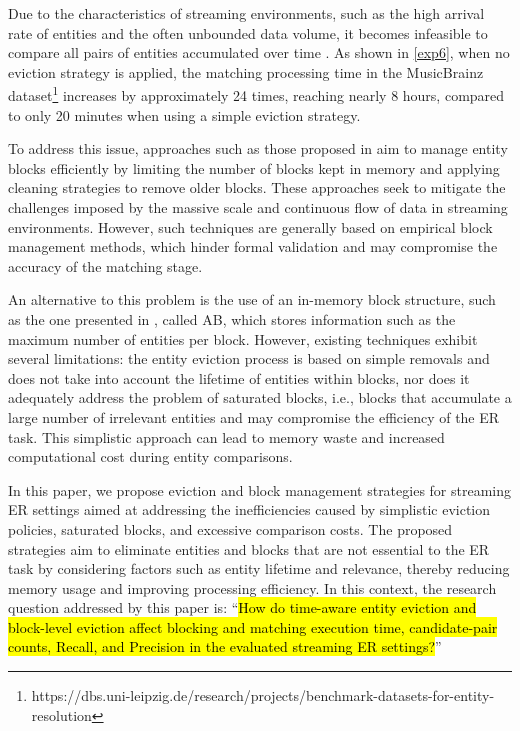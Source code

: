 \documentclass{ieeeaccess}
\begin{document}
Due to the characteristics of streaming environments,  such as the high arrival rate of entities and the often unbounded data volume, it becomes infeasible to compare all pairs of entities accumulated over time \cite{10.1145/3448016.3457238}. As shown in \ref{exp6}, when no eviction strategy is applied, the matching processing time in the MusicBrainz dataset\footnote{https://dbs.uni-leipzig.de/research/projects/benchmark-datasets-for-entity-resolution} increases by approximately 24 times, reaching nearly 8 hours, compared to only 20 minutes when using a simple eviction strategy.

To address this issue, approaches such as those proposed in \cite{Gazzarri2021,10.1145/3341105.3375776} aim to manage entity blocks efficiently by limiting the number of blocks kept in memory and applying cleaning strategies to remove older blocks. These approaches seek to mitigate the challenges imposed by the massive scale and continuous flow of data in streaming environments. However, such techniques are generally based on empirical block management methods, which hinder formal validation and may compromise the accuracy of the matching stage.

An alternative to this problem is the use of an in-memory block structure, such as the one presented in \cite{10.1109/TKDE.2024.3361022}, called AB, which stores information such as the maximum number of entities per block. However, existing techniques exhibit several limitations: the entity eviction process is based on simple removals and does not take into account the lifetime of entities within blocks, nor does it adequately address the problem of saturated blocks, i.e., blocks that accumulate a large number of irrelevant entities and may compromise the efficiency of the ER task. This simplistic approach can lead to memory waste and increased computational cost during entity comparisons.

In this paper, we propose eviction and block management strategies for streaming ER settings aimed at addressing the inefficiencies caused by simplistic eviction policies, saturated blocks, and excessive comparison costs. The proposed strategies aim to eliminate entities and blocks that are not essential to the ER task by considering factors such as entity lifetime and relevance, thereby reducing memory usage and improving processing efficiency. In this context, the research question addressed by this paper is: “\hl{How do time-aware entity eviction and block-level eviction affect blocking and matching execution time, candidate-pair counts, Recall, and Precision in the evaluated streaming ER settings?}”
\end{document}
